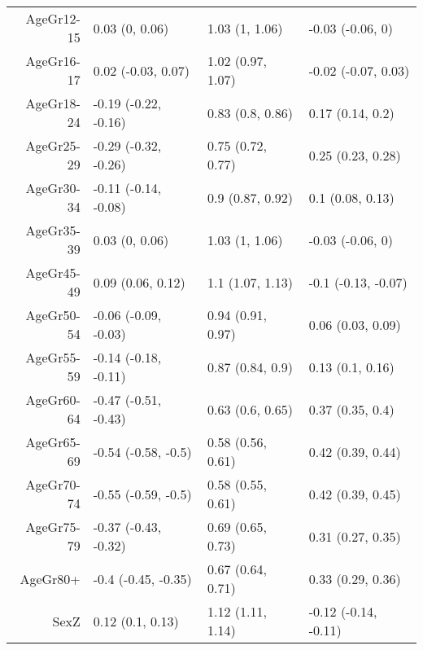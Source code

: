 \begin{table}[ht]
\begin{tabular}{rlll}
  AgeGr12-15 & 0.03 (0, 0.06) & 1.03 (1, 1.06) & -0.03 (-0.06, 0) \\ 
  AgeGr16-17 & 0.02 (-0.03, 0.07) & 1.02 (0.97, 1.07) & -0.02 (-0.07, 0.03) \\ 
  AgeGr18-24 & -0.19 (-0.22, -0.16) & 0.83 (0.8, 0.86) & 0.17 (0.14, 0.2) \\ 
  AgeGr25-29 & -0.29 (-0.32, -0.26) & 0.75 (0.72, 0.77) & 0.25 (0.23, 0.28) \\ 
  AgeGr30-34 & -0.11 (-0.14, -0.08) & 0.9 (0.87, 0.92) & 0.1 (0.08, 0.13) \\ 
  AgeGr35-39 & 0.03 (0, 0.06) & 1.03 (1, 1.06) & -0.03 (-0.06, 0) \\ 
  AgeGr45-49 & 0.09 (0.06, 0.12) & 1.1 (1.07, 1.13) & -0.1 (-0.13, -0.07) \\ 
  AgeGr50-54 & -0.06 (-0.09, -0.03) & 0.94 (0.91, 0.97) & 0.06 (0.03, 0.09) \\ 
  AgeGr55-59 & -0.14 (-0.18, -0.11) & 0.87 (0.84, 0.9) & 0.13 (0.1, 0.16) \\ 
  AgeGr60-64 & -0.47 (-0.51, -0.43) & 0.63 (0.6, 0.65) & 0.37 (0.35, 0.4) \\ 
  AgeGr65-69 & -0.54 (-0.58, -0.5) & 0.58 (0.56, 0.61) & 0.42 (0.39, 0.44) \\ 
  AgeGr70-74 & -0.55 (-0.59, -0.5) & 0.58 (0.55, 0.61) & 0.42 (0.39, 0.45) \\ 
  AgeGr75-79 & -0.37 (-0.43, -0.32) & 0.69 (0.65, 0.73) & 0.31 (0.27, 0.35) \\ 
  AgeGr80+ & -0.4 (-0.45, -0.35) & 0.67 (0.64, 0.71) & 0.33 (0.29, 0.36) \\ 
  SexZ & 0.12 (0.1, 0.13) & 1.12 (1.11, 1.14) & -0.12 (-0.14, -0.11) \\ 
   \hline
\end{tabular}
\end{table}
